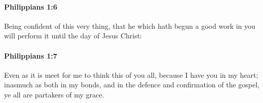 		\paragraph{Philippians 1:6} %
			\label{PHILIPPIANS-1-6}

			Being confident of this very thing, that he which hath begun a good work in you will perform it until the day of Jesus Christ:

			\begin{framed}
			\scriptsize
				\begin{compactdesc}
					\item[SBLG] 
				\end{compactdesc}
			\end{framed}

		\paragraph{Philippians 1:7} %
			\label{PHILIPPIANS-1-7}

			Even as it is meet for me to think this of you all, because I have you in my heart; inasmuch as both in my bonds, and in the defence and confirmation of the gospel, ye all are partakers of my grace.

